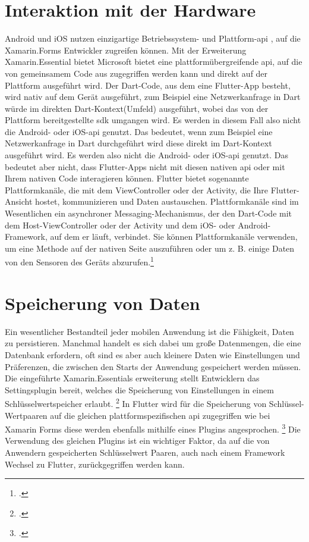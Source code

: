 



\section{Interaktion mit der Hardware}
Android und iOS nutzen einzigartige Betriebssystem- und Plattform-\acs{api} , auf die Xamarin.Forms Entwickler zugreifen können.  Mit der Erweiterung Xamarin.Essential bietet Microsoft bietet eine plattformübergreifende \ac{api}, auf die von gemeinsamem Code aus zugegriffen werden kann und direkt auf der Plattform ausgeführt wird.  Der Dart-Code, aus dem eine Flutter-App besteht, wird nativ auf dem Gerät ausgeführt,  zum Beispiel eine Netzwerkanfrage in Dart würde im direkten Dart-Kontext(Umfeld) ausgeführt,  wobei das von der Plattform bereitgestellte \ac{sdk} umgangen wird. Es werden in diesem Fall also nicht die Android- oder iOS-\acs{api}  genutzt.  Das bedeutet, wenn zum Beispiel eine Netzwerkanfrage in Dart durchgeführt wird diese direkt im Dart-Kontext ausgeführt wird.  Es werden also nicht die Android- oder iOS-\acs{api} genutzt.  Das bedeutet aber nicht, dass Flutter-Apps nicht mit diesen nativen \ac{api} oder mit Ihrem nativen Code interagieren können. Flutter bietet sogenannte Plattformkanäle, die mit dem ViewController oder der Activity, die Ihre Flutter-Ansicht hostet, kommunizieren und Daten austauschen. Plattformkanäle sind im Wesentlichen ein asynchroner Messaging-Mechanismus, der den Dart-Code mit dem Host-ViewController oder der Activity und dem iOS- oder Android-Framework, auf dem er läuft, verbindet. Sie können Plattformkanäle verwenden, um eine Methode auf der nativen Seite auszuführen oder um z. B. einige Daten von den Sensoren des Geräts abzurufen.\footcite[Vgl.][Abgerufen am \today]{GooglePlatformspecificCode2020}

\section{Speicherung von Daten}
Ein wesentlicher Bestandteil jeder mobilen Anwendung ist die Fähigkeit,  Daten zu persistieren.  Manchmal handelt es sich dabei um große Datenmengen,  die eine Datenbank erfordern,  oft sind es aber auch kleinere Daten wie Einstellungen und Präferenzen, die zwischen den Starts der Anwendung gespeichert werden müssen.   Die eingeführte Xamarin.Essentials erweiterung stellt Entwicklern das Settingsplugin bereit, welches die Speicherung von Einstellungen in einem Schlüsselwertspeicher erlaubt.  \footcite[Vgl.][Abgerufen am \today]{MicrosoftXamSettings2019} In Flutter wird für die Speicherung von Schlüssel-Wertpaaren auf die gleichen plattformspezifischen \ac{api} zugegriffen wie bei Xamarin Forms diese werden ebenfalls mithilfe eines Plugins angesprochen.  \footcite[Vgl.][Abgerufen am \today]{GoogleFlutterSharedPreferences2020}  Die Verwendung des gleichen Plugins ist ein wichtiger Faktor,  da auf die von Anwendern gespeicherten Schlüsselwert Paaren, auch nach einem Framework Wechsel zu Flutter,  zurückgegriffen werden kann. 


